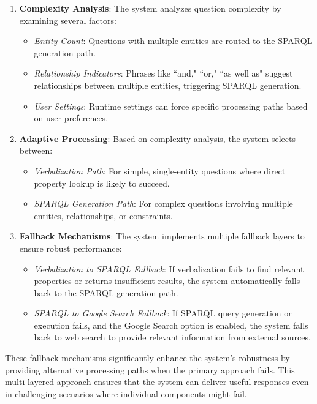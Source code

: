 \begin{enumerate}
    \item \textbf{Complexity Analysis}: The system analyzes question complexity by examining several factors:
    \begin{itemize}
        \item \textit{Entity Count}: Questions with multiple entities are routed to the SPARQL generation path.
        \item \textit{Relationship Indicators}: Phrases like ``and," ``or," ``as well as" suggest relationships between multiple entities, triggering SPARQL generation.
        \item \textit{User Settings}: Runtime settings can force specific processing paths based on user preferences.
    \end{itemize}
    
    \item \textbf{Adaptive Processing}: Based on complexity analysis, the system selects between:
    \begin{itemize}
        \item \textit{Verbalization Path}: For simple, single-entity questions where direct property lookup is likely to succeed.
        \item \textit{SPARQL Generation Path}: For complex questions involving multiple entities, relationships, or constraints.
    \end{itemize}
    
    \item \textbf{Fallback Mechanisms}: The system implements multiple fallback layers to ensure robust performance:
    \begin{itemize}
        \item \textit{Verbalization to SPARQL Fallback}: If verbalization fails to find relevant properties or returns insufficient results, the system automatically falls back to the SPARQL generation path.
        \item \textit{SPARQL to Google Search Fallback}: If SPARQL query generation or execution fails, and the Google Search option is enabled, the system falls back to web search to provide relevant information from external sources.
    \end{itemize}
\end{enumerate}

These fallback mechanisms significantly enhance the system's robustness by providing alternative processing paths when the primary approach fails. This multi-layered approach ensures that the system can deliver useful responses even in challenging scenarios where individual components might fail.

